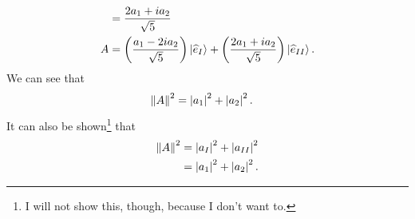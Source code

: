 \documentclass[10pt]{mypackage}
\begin{document}
\begin{example}
\begin{align*}
           &= \frac{2a_1 + ia_2}{\sqrt{5}}\\
    A &= \left(\frac{a_1 - 2ia_2}{\sqrt{5}}\right)\ket{\widehat{e}_{I}} + \left(\frac{2a_1 + ia_2}{\sqrt{5}}\right)\ket{\widehat{e}_{II}}.
  \end{align*}
  We can see that
  \begin{align*}
    \norm{A}^2 &= \left\vert a_1 \right\vert^2 + \left\vert a_2 \right\vert^2.
  \end{align*}
  It can also be shown\footnote{I will not show this, though, because I don't want to.} that
  \begin{align*}
    \norm{A}^2 &= \left\vert a_{I} \right\vert^2 + \left\vert a_{II} \right\vert^2\\
               &= \left\vert a_1 \right\vert^2 + \left\vert a_2 \right\vert^2.
  \end{align*}
\end{example}
\end{document}
